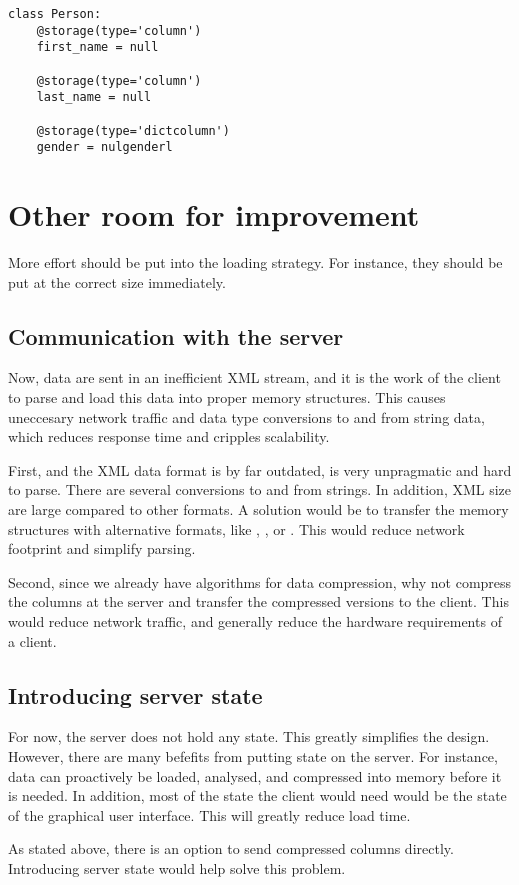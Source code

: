 \begin{lstlisting}
class Person:
    @storage(type='column')
    first_name = null

    @storage(type='column')
    last_name = null

    @storage(type='dictcolumn')
    gender = nulgenderl
\end{lstlisting}


\section{Other room for improvement}
\label{sec: Other room for improvement}
More effort should be put into the loading strategy. For instance, they should be put at the correct size immediately.

\subsection{Communication with the server}
\label{sub:Compressing data at the server}
Now, data are sent in an inefficient XML stream, and it is the work of the client to parse and load this data into proper memory structures. This causes uneccesary network traffic and data type conversions to and from string data, which reduces response time and cripples scalability.

First, and the XML data format is by far outdated, is very unpragmatic and hard to parse. There are several conversions to and from strings. In addition, XML size are large compared to other formats. A solution would be to transfer the memory structures with alternative formats, like , , or . This would reduce network footprint and simplify parsing. 

Second, since we already have algorithms for data compression, why not compress the columns at the server and transfer the compressed versions to the client. This would reduce network traffic, and generally reduce the hardware requirements of a client.

\subsection{Introducing server state}
\label{sub:Introducing server state}
For now, the server does not hold any state. This greatly simplifies the design. However, there are many befefits from putting state on the server. For instance, data can proactively be loaded, analysed, and compressed into memory before it is needed. In addition, most of the state the client would need would be the state of the graphical user interface. This will greatly reduce load time. 

As stated above, there is an option to send compressed columns directly. Introducing server state would help solve this problem.

